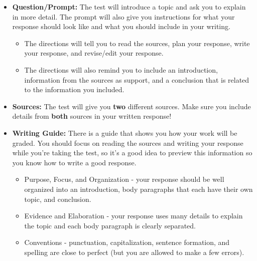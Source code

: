 \documentclass[12pt]{article}
\begin{document}
\begin{tcolorbox}[colframe=black!60, colback=white, 
coltitle=black, colbacktitle=black!15, fonttitle=\bfseries\Large, 
title=What does the Writing Task Look Like?, halign title=center, left=10pt, right=10pt, top=10pt, bottom=15pt]

\begin{itemize}
    \item \textbf{Question/Prompt:} The test will introduce a topic and ask you to explain in more detail. The prompt will also give you instructions for what your response should look like and what you should include in your writing.
    \begin{itemize}
        \item The directions will tell you to read the sources, plan your response, write your response, and revise/edit your response.
        \item The directions will also remind you to include an introduction, information from the sources as support, and a conclusion that is related to the information you included.
    \end{itemize}
    \item \textbf{Sources:} The test will give you \textbf{two} different sources. Make sure you include details from \textbf{both} sources in your written response!
    \item \textbf{Writing Guide:} There is a guide that shows you how your work will be graded. You should focus on reading the sources and writing your response while you're taking the test, so it's a good idea to preview this information so you know how to write a good response.
    \begin{itemize}
        \item Purpose, Focus, and Organization - your response should be well organized into an introduction, body paragraphs that each have their own topic, and conclusion.
        \item Evidence and Elaboration - your response uses many details to explain the topic and each body paragraph is clearly separated.
        \item Conventions - punctuation, capitalization, sentence formation, and spelling are close to perfect (but you are allowed to make a few errors).
    \end{itemize}
    \end{itemize}






\end{tcolorbox}
\end{document}
